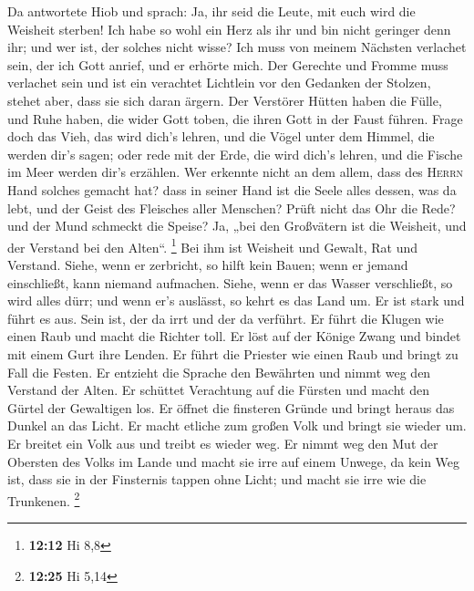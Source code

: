  Da antwortete Hiob und sprach:  Ja, ihr
seid die Leute, mit euch wird die Weisheit sterben!  Ich
habe so wohl ein Herz als ihr und bin nicht geringer denn ihr; und wer
ist, der solches nicht wisse?  Ich muss von meinem
Nächsten verlachet sein, der ich Gott anrief, und er erhörte mich. Der
Gerechte und Fromme muss verlachet sein  und ist ein
verachtet Lichtlein vor den Gedanken der Stolzen, stehet aber, dass sie
sich daran ärgern.  Der Verstörer Hütten haben die Fülle,
und Ruhe haben, die wider Gott toben, die ihren Gott in der Faust
führen.  Frage doch das Vieh, das wird dich's lehren, und
die Vögel unter dem Himmel, die werden dir's sagen;  oder
rede mit der Erde, die wird dich's lehren, und die Fische im Meer werden
dir's erzählen.  Wer erkennte nicht an dem allem, dass des
\textsc{Herrn} Hand solches gemacht hat?  dass in seiner
Hand ist die Seele alles dessen, was da lebt, und der Geist des
Fleisches aller Menschen?  Prüft nicht das Ohr die Rede?
und der Mund schmeckt die Speise?  Ja, „bei den
Großvätern ist die Weisheit, und der Verstand bei den Alten``.
\footnote{\textbf{12:12} Hi 8,8}  Bei ihm ist Weisheit
und Gewalt, Rat und Verstand.  Siehe, wenn er zerbricht,
so hilft kein Bauen; wenn er jemand einschließt, kann niemand aufmachen.
 Siehe, wenn er das Wasser verschließt, so wird alles
dürr; und wenn er's auslässt, so kehrt es das Land um. 
Er ist stark und führt es aus. Sein ist, der da irrt und der da
verführt.  Er führt die Klugen wie einen Raub und macht
die Richter toll.  Er löst auf der Könige Zwang und
bindet mit einem Gurt ihre Lenden.  Er führt die Priester
wie einen Raub und bringt zu Fall die Festen.  Er
entzieht die Sprache den Bewährten und nimmt weg den Verstand der Alten.
 Er schüttet Verachtung auf die Fürsten und macht den
Gürtel der Gewaltigen los.  Er öffnet die finsteren
Gründe und bringt heraus das Dunkel an das Licht.  Er
macht etliche zum großen Volk und bringt sie wieder um. Er breitet ein
Volk aus und treibt es wieder weg.  Er nimmt weg den Mut
der Obersten des Volks im Lande und macht sie irre auf einem Unwege, da
kein Weg ist,  dass sie in der Finsternis tappen ohne
Licht; und macht sie irre wie die Trunkenen. \footnote{\textbf{12:25} Hi
  5,14}


